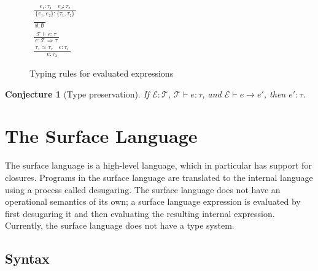 \documentclass{scrartcl}
\newenvironment{mathfigure}[2]
    {%
        \begin{figure}
        \newcommand{\figurelabel}{#1}
        \newcommand{\figurecaption}{#2}
        \centering
        \begin{math}
    }
    {
        \end{math}
        \caption{\figurecaption}
        \label{\figurelabel}
        \end{figure}%
    }
\newtheorem{conjecture}{Conjecture}
\newcommand{\deriv}[2]{\frac{\;#1\;}{\;#2\;}}
\newcommand{\derivlinedone}{\\[1.5ex]}
\newcommand{\nexthyp}{\quad}
\begin{document}
\begin{mathfigure}{typing-rules-for-evaluated-expressions}
                  {Typing rules for evaluated expressions}
%
\begin{gathered}
%
\deriv{e₁ : τ₁ \nexthyp e₂ : τ₂}{\{e₁, e₂\} : \{τ₁, τ₂\}}
\derivlinedone
\deriv{}{∅ : ∅}
\derivlinedone
\deriv{𝒯 ⊢ e : τ}{e : 𝒯 ⇒ τ}
\derivlinedone
\deriv{τ₁ ≈ τ₂ \nexthyp e : τ₁}{e : τ₂}
%
\end{gathered}
%
\end{mathfigure}

\begin{conjecture}[Type preservation]

If $ℰ : 𝒯$, $𝒯 ⊢ e : τ$, and $ℰ ⊢ e → e′$, then $e′ : τ$.

\end{conjecture}

\section{The Surface Language}
\label{the-surface-language}

The surface language is a high-level language, which in particular has
support for closures. Programs in the surface language are translated to
the internal language using a process called desugaring. The surface
language does not have an operational semantics of its own; a surface
language expression is evaluated by first desugaring it and then
evaluating the resulting internal expression. Currently, the surface
language does not have a type system.

\subsection{Syntax}
\end{document}
